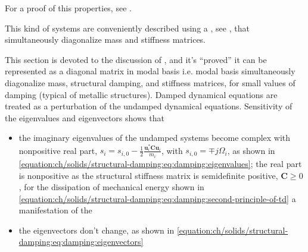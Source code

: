 \documentclass[letterpaper,10pt,english]{jupyterBook}
\begin{document}
\sphinxAtStartPar
For a proof of this properties, see .

\sphinxAtStartPar
This kind of systems are conveniently described using a , see {\hyperref[\detokenize{ch/solids/small-displacements-numerics:solid-mechanics-intro-small-displacements-numerics}]{}}, that simultaneously diagonalize mass and stiffness matrices.

\sphinxAtStartPar
This section is devoted to the discussion of , and it’s “proved” it can be represented as a diagonal matrix in modal basis \sphinxhyphen{} i.e. modal basis simultaneously diagonalize mass, structural damping, and stiffness matrices, for small values of damping (typical of metallic structures).
Damped dynamical equations are treated as a perturbation of the undamped dynamical equations. Sensitivity of the eigenvalues and eigenvectors shows that
\begin{itemize}
\item {} 
\sphinxAtStartPar
the imaginary eigenvalues of the undamped systems become complex with non\sphinxhyphen{}positive real part, \(s_i = s_{i,0} - \frac{1}{2} \frac{\mathbf{u}_i^* \mathbf{C} \mathbf{u}_i}{m_i}\), with \(s_{i,0} = \mp j \Omega_i\), as shown in \eqref{equation:ch/solids/structural-damping:eq:damping:eigenvalues}; the real part is non\sphinxhyphen{}positive as the structural stiffness matrix is semi\sphinxhyphen{}definite positive, \(\mathbf{C} \ge 0\), for the dissipation of mechanical energy shown in \eqref{equation:ch/solids/structural-damping:eq:damping:second-principle-of-td} \sphinxhyphen{} a manifestation of the 

\item {} 
\sphinxAtStartPar
the eigenvectors don’t change, as shown in \eqref{equation:ch/solids/structural-damping:eq:damping:eigenvectors}

\end{itemize}
\end{document}
